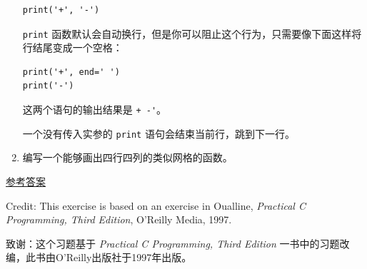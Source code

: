 \begin{exercise}
\begin{enumerate}
\begin{lstlisting}
print('+', '-')
\end{lstlisting}
%
\lstinline{print} 函数默认会自动换行，但是你可以阻止这个行为，只需要像下面这样将行结尾变成一个空格：

\begin{lstlisting}
print('+', end=' ')
print('-')
\end{lstlisting}
%

这两个语句的输出结果是 \lstinline{+ -'}。

一个没有传入实参的 \lstinline{print} 语句会结束当前行，跳到下一行。

\item 编写一个能够画出四行四列的类似网格的函数。

\end{enumerate}


\href{http://thinkpython2.com/code/grid.py}{参考答案}

Credit: This exercise is based on an exercise in Oualline, {\em
    Practical C Programming, Third Edition}, O'Reilly Media, 1997.

致谢：这个习题基于 {\em Practical C Programming, Third
Edition} 一书中的习题改编，此书由O’Reilly出版社于1997年出版。

\end{exercise}

